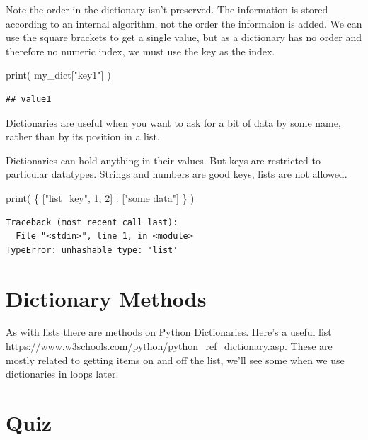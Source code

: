 \documentclass[]{book}
\newenvironment{Shaded}{\begin{snugshade}}{\end{snugshade}}
\newcommand{\BuiltInTok}[1]{#1}
\newcommand{\DecValTok}[1]{\textcolor[rgb]{0.00,0.00,0.81}{#1}}
\newcommand{\NormalTok}[1]{#1}
\newcommand{\StringTok}[1]{\textcolor[rgb]{0.31,0.60,0.02}{#1}}
\theoremstyle{definition}
\theoremstyle{definition}
\theoremstyle{definition}
\theoremstyle{remark}
\begin{document}
Note the order in the dictionary isn't preserved. The information is
stored according to an internal algorithm, not the order the informaion
is added. We can use the square brackets to get a single value, but as a
dictionary has no order and therefore no numeric index, we must use the
key as the index.

\begin{Shaded}
\begin{Highlighting}[]
\BuiltInTok{print}\NormalTok{( my_dict[}\StringTok{"key1"}\NormalTok{] )}
\end{Highlighting}
\end{Shaded}

\begin{verbatim}
## value1
\end{verbatim}

Dictionaries are useful when you want to ask for a bit of data by some
name, rather than by its position in a list.

Dictionaries can hold anything in their values. But keys are restricted
to particular datatypes. Strings and numbers are good keys, lists are
not allowed.

\begin{Shaded}
\begin{Highlighting}[]
\BuiltInTok{print}\NormalTok{( \{ [}\StringTok{"list_key"}\NormalTok{, }\DecValTok{1}\NormalTok{, }\DecValTok{2}\NormalTok{] : [}\StringTok{"some data"}\NormalTok{]  \} )}
\end{Highlighting}
\end{Shaded}

\begin{verbatim}
Traceback (most recent call last):
  File "<stdin>", line 1, in <module>
TypeError: unhashable type: 'list'
\end{verbatim}

\hypertarget{dictionary-methods}{%
\section{Dictionary Methods}\label{dictionary-methods}}

As with lists there are methods on Python Dictionaries. Here's a useful
list \url{https://www.w3schools.com/python/python_ref_dictionary.asp}.
These are mostly related to getting items on and off the list, we'll see
some when we use dictionaries in loops later.

\hypertarget{quiz-1}{%
\section{Quiz}\label{quiz-1}}
\end{document}

